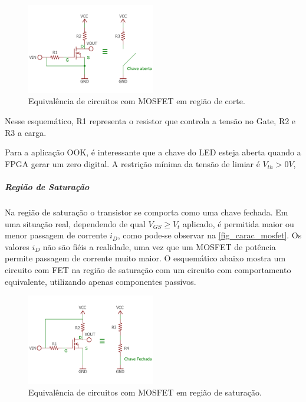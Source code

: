	\begin{figure}[htb]
		\caption{\label{fig_mosfet_cutoff} Equivalência de circuitos com MOSFET em região de corte.}
		\centering
		\includegraphics[width=0.5\textwidth, trim={0cm 2cm 0cm 2cm}, clip]{circuits/mosfet_cutoff.pdf}
	\end{figure}
	
	Nesse esquemático, R1 representa o resistor que controla a tensão no Gate, R2 e R3 a carga.
	
	Para a aplicação OOK, é interessante que a chave do LED esteja aberta quando a FPGA gerar um zero digital. A restrição mínima da tensão de limiar é $V_{th} > 0V$, 
	
	\subparagraph{Região de Saturação}
	
	Na região de saturação o transistor se comporta como uma chave fechada. Em uma situação real, dependendo de qual $V_{GS} \geq V_{t}$ aplicado, é permitida maior ou menor passagem de corrente $i_{D}$, como pode-se observar na \autoref{fig_carac_mosfet}. Os valores $i_{D}$ não são fiéis a realidade, uma vez que um MOSFET de potência permite passagem de corrente muito maior. O esquemático abaixo mostra um circuito com FET na região de saturação com um circuito com comportamento equivalente, utilizando apenas componentes passivos.
	
	\begin{figure}[htb]
		\caption{\label{fig_mosfet_saturation} Equivalência de circuitos com MOSFET em região de saturação.}
		\centering
		\includegraphics[width=0.5\textwidth, trim={0cm 2cm 0cm 2cm}, clip]{circuits/mosfet_saturation.pdf}
	\end{figure}
	
